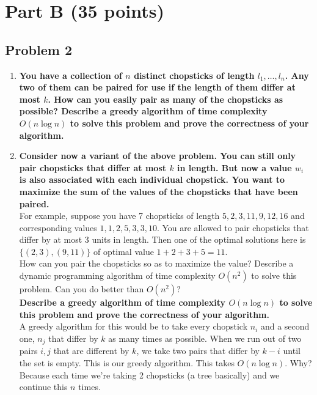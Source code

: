 \documentclass[11pt]{article}
\begin{document}
\section*{Part B (35 points)}

\subsection*{Problem 2}

\begin{enumerate}[label=\Alph*.]

\item \textbf{You have a collection of $n$ distinct chopsticks of
length $l_{1},\dots,l_{n}$. Any two of them can be paired for use if
the length of them differ at most $k$. How can you easily pair as many
of the chopsticks as possible? Describe a greedy algorithm of time
complexity $O(n\log n)$ to solve this problem and prove the
correctness of your algorithm.}\\

\item \textbf{Consider now a variant of the above problem. You
can still only pair chopsticks that differ at most $k$ in length. But
now a value $w_{i}$ is also associated with each individual
chopstick. You want to maximize the sum of the values of the
chopsticks that have been paired.}\\

\noindent For example, suppose you have 7 chopsticks of length
$5,2,3,11,9,12,16$ and corresponding values $1,1,2,5,3,3,10$. You are
allowed to pair chopsticks that differ by at most 3 units in
length. Then one of the optimal solutions here is $\{ (2,3),(9,11) \}$
of optimal value $1+2+3+5=11$.\\

\noindent How can you pair the chopsticks so as to maximize the value?
Describe a dynamic programming algorithm of time complexity $O(n^{2})$
to solve this problem. Can you do better than $O(n^{2})$?\\

\noindent \textbf{Describe a greedy algorithm of time
complexity $O(n\log n)$ to solve this problem and prove the
correctness of your algorithm.}\\

A greedy algorithm for this would be to take every chopstick $n_i$ and a second one, $n_j$ that differ by $k$ as many times as possible. When we run out of two pairs $i,j$ that are different by $k$, we take two pairs that differ by $k-i$ until the set is empty. This is our greedy algorithm. This takes $O(n\log n)$. Why? Because each time we're taking 2 chopsticks (a tree basically) and we continue this $n$ times.


\end{enumerate}
\end{document}
